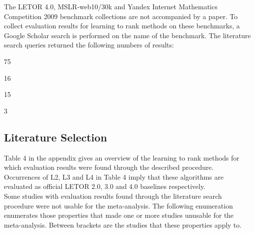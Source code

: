 \documentclass{llncs}
\begin{document}
The LETOR 4.0, MSLR-web10/30k and Yandex Internet Mathematics Competition 2009 benchmark collections are not accompanied by a paper. To collect evaluation results for learning to rank methods on these benchmarks, a Google Scholar search is performed on the name of the benchmark. The literature search queries returned the following numbers of results:
\begin{description}
\item["LETOR 4.0":]75
\item["MSLR-web10k":]16
\item["MSLR-web30k":]15
\item["Yandex Internet Mathematics":]3
\end{description}
\vspace{-0.08in}
\subsection{Literature Selection}
Table 4 in the appendix gives an overview of the learning to rank methods for which evaluation results were found through the described procedure. Occurrences of L2, L3 and L4 in Table 4 imply that these algorithms are evaluated as official LETOR 2.0, 3.0 and 4.0 baselines respectively.\\
Some studies with evaluation results found through the literature search procedure were not usable for the meta-analysis. The following enumeration enumerates those properties that made one or more studies unusable for the meta-analysis. Between brackets are the studies that these properties apply to.
\end{document}
